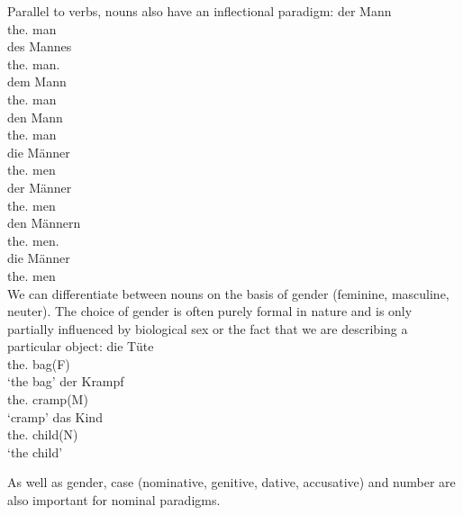 {Parallel to verbs, nouns also have an inflectional paradigm:
\eal
\ex 
\gll der Mann\\
	 the.\nom{} man\\
\ex 
\gll des Mannes\\
	 the.\gen{} man.\gen{}\\
\ex 
\gll dem Mann\\
	 the.\dat{} man\\
\ex 
\gll den Mann\\
	 the.\acc{} man\\
\ex 
\gll die Männer\\
	 the.\nom{} men\\
\ex 
\gll der Männer\\
	 the.\gen{} men\\
\ex 
\gll den Männern\\
	 the.\dat{} men.\dat\\
\ex 
\gll die Männer\\
	 the.\acc{} men\\
\zl
We can differentiate between nouns on the basis of gender (feminine, masculine, neuter). The choice of gender is often
purely formal in nature and is only partially influenced by biological sex or the fact that we are describing a particular object:
\eal
\ex
\gll die Tüte\\
	 the.\fem{} bag(F)\\
\glt `the bag'
\ex 
\gll der Krampf\\
	 the.\mas{} cramp(M)\\
\glt `cramp'
\ex 
\gll das Kind\\
	 the.\neu{} child(N)\\
\glt `the child'
\zl


As well as gender, case (nominative,
genitive, dative, accusative) and number are
also important for nominal paradigms.

}
